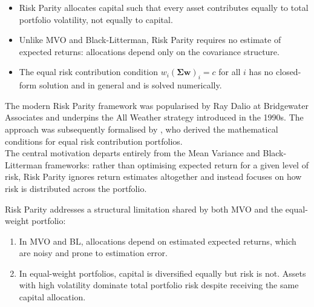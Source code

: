 \documentclass[a4paper,alpha-refs]{scr-contemporary}
\numberwithin{equation}{section}
\begin{document}
\begin{keypoints*}
\begin{itemize}
  \item Risk Parity allocates capital such that every asset contributes                                       
    equally to total portfolio volatility, not equally to capital.
  \item Unlike MVO and Black-Litterman, Risk Parity requires no estimate
    of expected returns: allocations depend only on the covariance structure.
  \item The equal risk contribution condition $w_i(\boldsymbol{\Sigma}\mathbf{w})_i = c$
    for all $i$ has no closed-form solution and in general and is solved numerically.
\end{itemize}
\end{keypoints*}

\indent \indent The modern Risk Parity framework was popularised by Ray Dalio 
at Bridgewater Associates and underpins the All Weather strategy introduced 
in the 1990s. The approach was subsequently
formalised by \citet{maillard_properties_2010}, who derived the mathematical
conditions for equal risk contribution portfolios. \\
\indent The central motivation
departs entirely from the Mean Variance and Black-Litterman frameworks: rather than optimising
expected return for a given level of risk, Risk Parity ignores return estimates
altogether and instead focuses on how risk is distributed across the portfolio.

\indent Risk Parity addresses a structural limitation shared by both MVO and
the equal-weight portfolio:
\begin{enumerate}
  \vspace{-2mm}
  \item In MVO and BL, allocations depend on estimated expected returns, which
  are noisy and prone to estimation error.
  \item In equal-weight portfolios, capital is diversified equally but risk is not.
  Assets with high volatility dominate total portfolio risk despite receiving the
  same capital allocation.
  \vspace{-2mm}
\end{enumerate}
\end{document}
